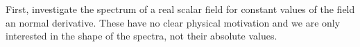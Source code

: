 First, investigate the spectrum of a real scalar field for constant values of the field an normal derivative. These have no clear physical motivation and we are only interested in the shape of the spectra, not their absolute values.\\

